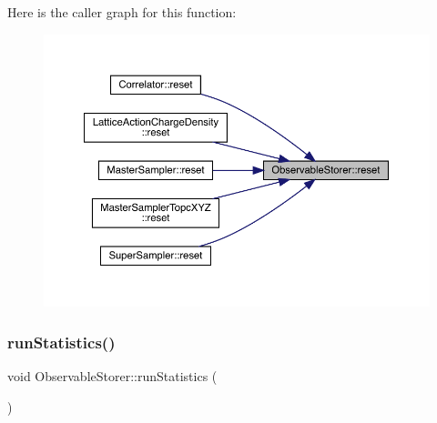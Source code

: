 Here is the caller graph for this function\+:\nopagebreak
\begin{figure}[H]
\begin{center}
\leavevmode
\includegraphics[width=350pt]{class_observable_storer_a7b6285a532d796816d75262f91d43dad_icgraph}
\end{center}
\end{figure}
\mbox{\label{class_observable_storer_a41b3756b423d31c6535d2981ef92d1a1}} 
\subsubsection{\texorpdfstring{runStatistics()}{runStatistics()}}
{\footnotesize\ttfamily void Observable\+Storer\+::run\+Statistics (\begin{DoxyParamCaption}{ }\end{DoxyParamCaption})}

